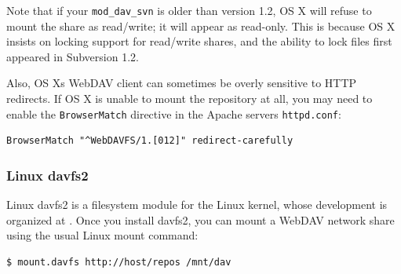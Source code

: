 Note that if your \texttt{mod\_dav\_svn} is older than version 1.2, OS X
will refuse to mount the share as read/write; it will appear as
read-only. This is because OS X insists on locking support for
read/write shares, and the ability to lock files first appeared in
Subversion 1.2.

Also, OS X\textquotesingle s WebDAV client can sometimes be overly
sensitive to HTTP redirects. If OS X is unable to mount the repository
at all, you may need to enable the \texttt{BrowserMatch} directive in
the Apache server\textquotesingle s \texttt{httpd.conf}:

\begin{verbatim}
BrowserMatch "^WebDAVFS/1.[012]" redirect-carefully
\end{verbatim}

\subsubsection{Linux davfs2}\label{svn.webdav.clients.fs-impl.linux}

Linux davfs2 is a filesystem module for the Linux kernel, whose
development is organized at
\href{https://savannah.nongnu.org/projects/davfs2}{}. Once you install
davfs2, you can mount a WebDAV network share using the usual Linux mount
command:

\begin{verbatim}
$ mount.davfs http://host/repos /mnt/dav
\end{verbatim}

